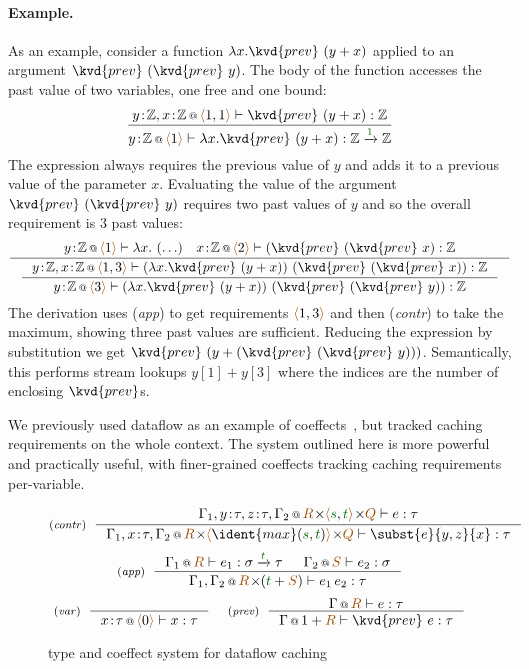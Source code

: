 \paragraph{Example.} As an example, consider a function $\lambda x.\kvd{prev}~(y+x)$ applied to an argument
$\kvd{prev}~(\kvd{prev}~y)$. The body of the function accesses the past value of two variables, one free
and one bound:
\[
\dfrac
  {\coctx{y\!:\!\mathbb{Z}, x\!:\!\mathbb{Z}}{\alift{1, 1}} \vdash \kvd{prev}~(y+x) : \mathbb{Z} }
  {\coctx{y\!:\!\mathbb{Z}}{\alift{1}} \vdash \lambda x . \kvd{prev}~(y+x) : \mathbb{Z} \xrightarrow{\cclrd{1}} \mathbb{Z} }
\]
The expression always requires the previous value of $y$ and adds it to
a previous value of the parameter $x$. Evaluating the value of the
argument $\kvd{prev}~(\kvd{prev}~y)$ requires two past values of $y$
and so the overall requirement is $3$ past values:
\[
\inference
  { \coctx{y\!:\!\mathbb{Z}}{\alift{1} } \vdash \lambda x.~(\ldots) \quad  \coctx{x\!:\!\mathbb{Z}}{\alift{2}} \vdash (\kvd{prev}~(\kvd{prev}~x) : \mathbb{Z} }
{\inference
  { \coctx{y\!:\!\mathbb{Z}, x\!:\!\mathbb{Z}}{\alift{1,3}} \vdash (\lambda x.\kvd{prev}~(y+x))~(\kvd{prev}~(\kvd{prev}~x)) : \mathbb{Z} }
  { \coctx{y\!:\!\mathbb{Z}}{\alift{3}} \vdash (\lambda x.\kvd{prev}~(y+x))~(\kvd{prev}~(\kvd{prev}~y)) : \mathbb{Z} } }
\]
The derivation uses (\emph{app}) to get requirements $\alift{1,3}$ and then 
(\emph{contr}) to take the maximum, showing three past values are sufficient. Reducing 
the expression by substitution we get $\kvd{prev}~(y+(\kvd{prev}~(\kvd{prev}~y)))$. 
Semantically, this performs stream lookups $y[1] + y[3]$ where the indices are the 
number of enclosing $\kvd{prev}$s.%

We previously used dataflow as an example of
coeffects~\cite{petricek2013coeffects}, but tracked caching
requirements on the whole context. The system outlined here is more
powerful and practically useful, with finer-grained coeffects tracking
caching requirements per-variable.


\begin{figure}[t]
\[
\tyrule{contr}
  {\coctx{\Gamma_1,y\!:\!\tau,z\!:\!\tau,\Gamma_2}{\aclrd{R}\cons\alift{\cclrd{s},\cclrd{t}} \cons \aclrd{Q}} \vdash e : \tau}
  {\coctx{\Gamma_1,x\!:\!\tau,\Gamma_2}{\aclrd{R}\cons\alift{\ident{max}(\cclrd{s},\cclrd{t})} \cons \aclrd{Q}} \vdash \subst{e}{y,z}{x} : \tau}
\]
\[
\tyrule{app}
  { \coctx{\Gamma_1}{\aclrd{R}} \vdash e_1 : \sigma \xrightarrow{\cclrd{t}} \tau &
    \coctx{\Gamma_2}{\aclrd{S}} \vdash e_2 : \sigma }
  { \coctx{\Gamma_1, \Gamma_2}{\aclrd{R} \cons (\cclrd{t} + \aclrd{S})} \vdash e_1 \, e_2 : \tau} 
\]
\[
\tyrule{var}{}
  {\coctx{x\!:\!\tau}{\alift{0}} \vdash x : \tau}
\quad\;
\tyrule{prev}
  {\coctx{\Gamma}{\aclrd{R}} \vdash e : \tau}
  {\coctx{\Gamma}{1 + \aclrd{R}} \vdash \kvd{prev}~e : \tau}  
\]
\caption{type and coeffect system for dataflow caching}
\label{fig:dataflow-coeff}
\end{figure}

